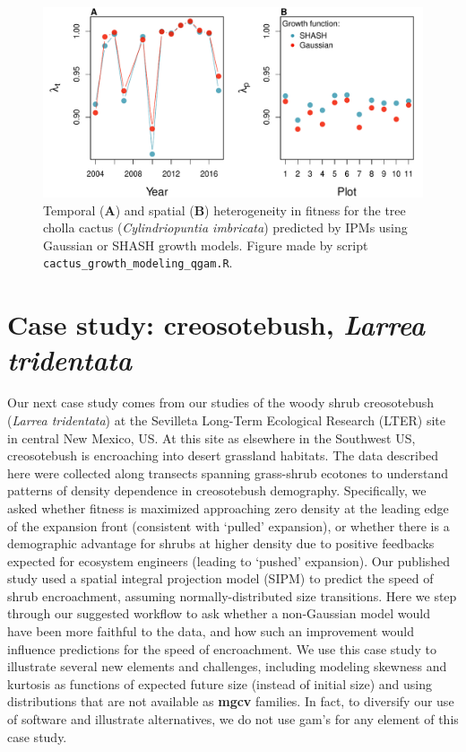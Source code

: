 \documentclass[12pt]{article}
\begin{document}
\begin{figure}[tbp]
	\centering
	\includegraphics[width=1.0\textwidth]{figures/cactus_lambda_years_plots.pdf}
	\caption{Temporal (\textbf{A}) and spatial (\textbf{B}) heterogeneity in fitness for the tree cholla cactus (\textit{Cylindriopuntia imbricata}) predicted by IPMs using Gaussian or SHASH growth models. Figure made by script \texttt{cactus\_growth\_modeling\_qgam.R}.}
	\label{fig:cactus_lambda}
\end{figure} 


\section{Case study: creosotebush, \emph{Larrea tridentata}}
Our next case study comes from our studies of the woody shrub creosotebush (\emph{Larrea tridentata}) at the Sevilleta Long-Term Ecological Research (LTER) site in central New Mexico, US. 
At this site as elsewhere in the Southwest US, creosotebush is encroaching into desert grassland habitats.
The data described here were collected along transects spanning grass-shrub ecotones to understand patterns of density dependence in creosotebush demography.
Specifically, we asked whether fitness is maximized approaching zero density at the leading edge of the expansion front (consistent with `pulled' expansion), or whether there is a demographic advantage for shrubs at higher density due to positive feedbacks expected for ecosystem engineers (leading to `pushed' expansion). 
Our published study \citep{drees2023demography} used a spatial integral projection model (SIPM) to predict the speed of shrub encroachment, assuming normally-distributed size transitions. 
Here we step through our suggested workflow to ask whether a non-Gaussian model would have been more faithful to the data, and how such an improvement would influence predictions for the speed of encroachment.
We use this case study to illustrate several new elements and challenges, including modeling skewness and kurtosis as functions of expected future size (instead of initial size) and using distributions that are not available as \textbf{mgcv} families.
In fact, to diversify our use of software and illustrate alternatives, we do not use gam's for any element of this case study.
\end{document}
